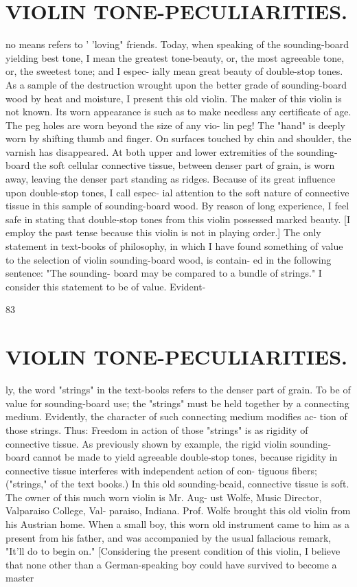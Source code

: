 \documentclass{article}
\begin{document}
\section*{VIOLIN TONE-PECULIARITIES.}
no means refers to ' 'loving" friends. Today, when speaking of the sounding-board yielding best tone, I mean the greatest tone-beauty, or, the most agreeable tone, or, the sweetest tone; and I espec- ially mean great beauty of double-stop tones. As a sample of the destruction wrought upon the better grade of sounding-board wood by heat and moisture, I present this old violin. The maker of this violin is not known. Its worn appearance is such as to make needless any certificate of age. The peg holes are worn beyond the size of any vio- lin peg! The "hand" is deeply worn by shifting thumb and finger. On surfaces touched by chin and shoulder, the varnish has disappeared. At both upper and lower extremities of the sounding- board the soft cellular connective tissue, between denser part of grain, is worn away, leaving the denser part standing as ridges. Because of its great influence upon double-stop tones, I call espec- ial attention to the soft nature of connective tissue in this sample of sounding-board wood. By reason of long experience, I feel safe in stating that double-stop tones from this violin possessed marked beauty. [I employ the past tense because this violin is not in playing order.] The only statement in text-books of philosophy, in which I have found something of value to the selection of violin sounding-board wood, is contain- ed in the following sentence: "The sounding- board may be compared to a bundle of strings." I consider this statement to be of value. Evident-

83

\section*{VIOLIN TONE-PECULIARITIES.}
ly, the word "strings" in the text-books refers to the denser part of grain. To be of value for sounding-board use; the "strings" must be held together by a connecting medium. Evidently, the character of such connecting medium modifies ac- tion of those strings. Thus: Freedom in action of those "strings" is as rigidity of connective tissue. As previously shown by example, the rigid violin sounding-board cannot be made to yield agreeable double-stop tones, because rigidity in connective tissue interferes with independent action of con- tiguous fibers; ("strings," of the text books.) In this old sounding-bcaid, connective tissue is soft. The owner of this much worn violin is Mr. Aug- ust Wolfe, Music Director, Valparaiso College, Val- paraiso, Indiana. Prof. Wolfe brought this old violin from his Austrian home. When a small boy, this worn old instrument came to him as a present from his father, and was accompanied by the usual fallacious remark, "It'll do to begin on." [Considering the present condition of this violin, I believe that none other than a German-speaking boy could have survived to become a master
\end{document}
